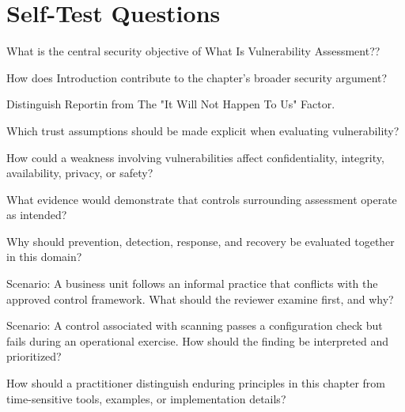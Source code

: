 \documentclass[11pt,letterpaper]{article}
\begin{document}
\section*{Self-Test Questions}
\begin{CornellRecallList}
\item What is the central security objective of What Is Vulnerability Assessment??
\item How does Introduction contribute to the chapter's broader security argument?
\item Distinguish Reportin from The "It Will Not Happen To Us" Factor.
\item Which trust assumptions should be made explicit when evaluating vulnerability?
\item How could a weakness involving vulnerabilities affect confidentiality, integrity, availability, privacy, or safety?
\item What evidence would demonstrate that controls surrounding assessment operate as intended?
\item Why should prevention, detection, response, and recovery be evaluated together in this domain?
\item Scenario: A business unit follows an informal practice that conflicts with the approved control framework. What should the reviewer examine first, and why?
\item Scenario: A control associated with scanning passes a configuration check but fails during an operational exercise. How should the finding be interpreted and prioritized?
\item How should a practitioner distinguish enduring principles in this chapter from time-sensitive tools, examples, or implementation details?
\end{CornellRecallList}
\end{document}
